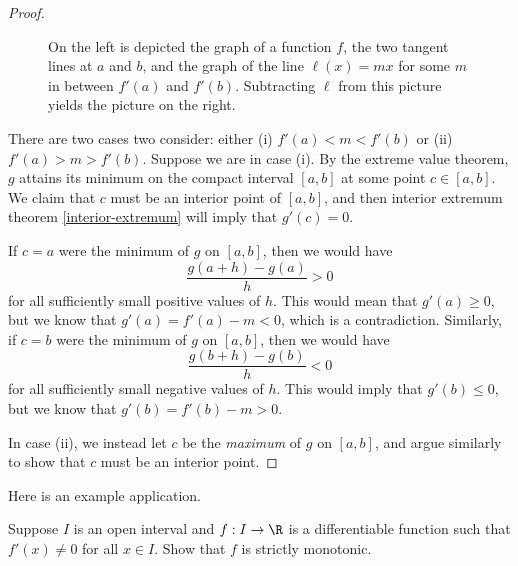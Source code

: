 \begin{proof}
\begin{figure}
\begin{center}
		\end{center}
		\caption{On the left is depicted the graph of a function $f$, the two tangent lines at $a$ and $b$, and the graph of the line $\ell(x) = mx$ for some $m$ in between $f'(a)$ and $f'(b)$. Subtracting $\ell$ from this picture yields the picture on the right.}  \label{subtracting-a-line}
	\end{figure}
	
	There are two cases two consider: either (i) $f'(a) < m < f'(b)$ or (ii) $f'(a) > m > f'(b)$. Suppose we are in case (i). By the extreme value theorem, $g$ attains its minimum on the compact interval $[a,b]$ at some point $c \in [a,b]$. We claim that $c$ must be an interior point of $[a,b]$, and then interior extremum theorem \ref{interior-extremum} will imply that $g'(c) = 0$. 
	
	If $c = a$ were the minimum of $g$ on $[a,b]$, then we would have 
	\[ \frac{g(a+h)-g(a)}{h} > 0 \]
	for all sufficiently small positive values of $h$. This would mean that $g'(a) \geq 0$, but we know that $g'(a) = f'(a) - m < 0$, which is a contradiction. Similarly, if $c = b$ were the minimum of $g$ on $[a,b]$, then we would have
	\[ \frac{g(b+h)-g(b)}{h} < 0 \]
	for all sufficiently small negative values of $h$. This would imply that $g'(b) \leq 0$, but we know that $g'(b) = f'(b) - m > 0$. 
	
	In case (ii), we instead let $c$ be the \emph{maximum} of $g$ on $[a,b]$, and argue similarly to show that $c$ must be an interior point. 
\end{proof}

Here is an example application. 

\begin{exercise}
	Suppose $I$ is an open interval and $f : I \to \R$ is a differentiable function such that $f'(x) \neq 0$ for all $x \in I$. Show that $f$ is strictly monotonic. 
\end{exercise}

